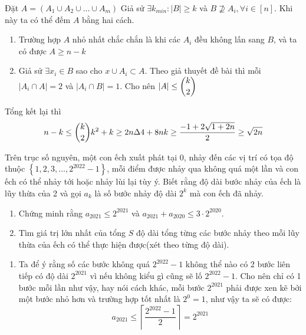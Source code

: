 \documentclass[11pt]{scrartcl}
\begin{document}
\begin{itemize}[label=, leftmargin=0em, itemsep=0.5em]
\begin{bt}
    \end{bt}
    \begin{sol}
        Đặt $A = (A_1 \cup A_2 \cup \dots \cup A_m)$
        Giả sử $\exists k_{min}: |B| \geq k$ và $B \nsupseteq A_i, \forall i \in [n]$. Khi này ta có thể đếm $A$ bằng hai cách.
        \begin{enumerate}
            \item  {} Trường hợp $A$ nhỏ nhất chắc chắn là khi các $A_i$ đều không lấn sang $B$, và ta có được $A \geq n - k $ 
            \item {}Giả sử $\exists x_i \in B$ sao cho $x \cup A_i \subset A$. Theo giả thuyết đề bài thì mỗi $|A_i \cap A| = 2$ và $|A_i \cap B| = 1$. Cho nên $|A| \leq \dbinom{k}{2}$
        \end{enumerate}
        Tổng kết lại thì $$n - k \leq \dbinom{k}{2} \Leftrightarrow  k^2 + k \geq 2n \Rightarrow \Delta \lra 4 + 8n \Rightarrow k \geq \frac{-1 + 2\sqrt{1 + 2n}}{2} \geq \sqrt{2n}$$
    \end{sol}
    \begin{bt}
        Trên trục số nguyên, một con ếch xuất phát tại 0, nhảy đến các vị trí có tọa độ thuộc $\left\{1,2,3, \ldots, 2^{2022}-1\right\}$, mỗi điểm được nhảy qua không quá một lần và con ếch có thể nhảy tới hoặc nhảy lùi lại tùy ý. Biết rằng độ dài bước nhảy của ếch là lũy thừa của 2 và gọi $a_k$ là số bước nhảy độ dài $2^k$ mà con ếch đã nhảy.
    \begin{enumerate}[label=(\alph*)]
        \item Chứng minh rằng $a_{2021} \leq 2^{2021}$ và $a_{2021}+a_{2020} \leq 3 \cdot 2^{2020}$.
        \item Tìm giá trị lớn nhất của tổng $S$ độ dài tổng từng các bước nhảy theo mỗi lũy thừa của ếch có thể thực hiện được(xét theo từng độ dài).
    \end{enumerate}
    \end{bt}
    \begin{sol}
        \begin{enumerate}
            \item Ta để ý rằng số các bước không quá $2^{2022} -1 $ không thể nào có 2 bước liên tiếp có độ dài $2^{2021}$ vì nếu không kiểu gì cũng sẽ lố $2^{2022} - 1$. Cho nên chỉ có 1 bước mỗi lần như vậy, hay nói cách khác, mỗi bước $2^{2021}$ phải được xen kẽ bởi một bước nhỏ hơn và trường hợp tốt nhất là $2^0 = 1$, như vậy ta sẽ có được:
            $$
            a_{2021} \leq \left\lceil \frac{2^{2022} - 1}{2}\right\rceil   = 2^{2021}
$$
\end{enumerate}
\end{sol}
\end{itemize}
\end{document}

